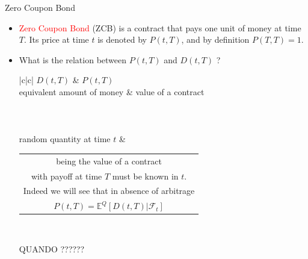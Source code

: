 \documentclass{beamer}
\begin{document}
\begin{frame}{Zero Coupon Bond}
	\begin{itemize}
		\item \textcolor{red}{Zero Coupon Bond} (ZCB) is a contract that pays one unit of money at time $T$. Its price at time $t$ is denoted by $P(t,T)$, and by definition $P(T,T) = 1$.
		\item What is the relation between $P(t,T)$ and $D(t,T)$ ? \\
		\renewcommand{\arraystretch}{1.2}
		\footnotesize{\tiny {\tiny }}{
			\begin{table}[bt]
				\begin{tabular}{|c|c|} \hline
					$D(t, T)$ & $P(t, T)$ \\ \hline
					equivalent amount of money & value of a contract \\ \hline
					 \\ \hline
					 \\ \hline 
					 \\ \hline
					random quantity at time $t$ &
					\renewcommand{\arraystretch}{1.0} 
					\begin{tabular}{@{}c@{}}
						being the value of a contract\\ with payoff at time $T$ must be known in $t$. \\
                        Indeed we will see that in absence of arbitrage\\
                    	$P(t, T) = \mathbb{E}^Q[D(t, T)|\mathcal{F}_t]$
					\end{tabular} \\ \hline
				\end{tabular}
			\end{table}
		}
	QUANDO ??????
	\end{itemize}
\end{frame}
\end{document}
